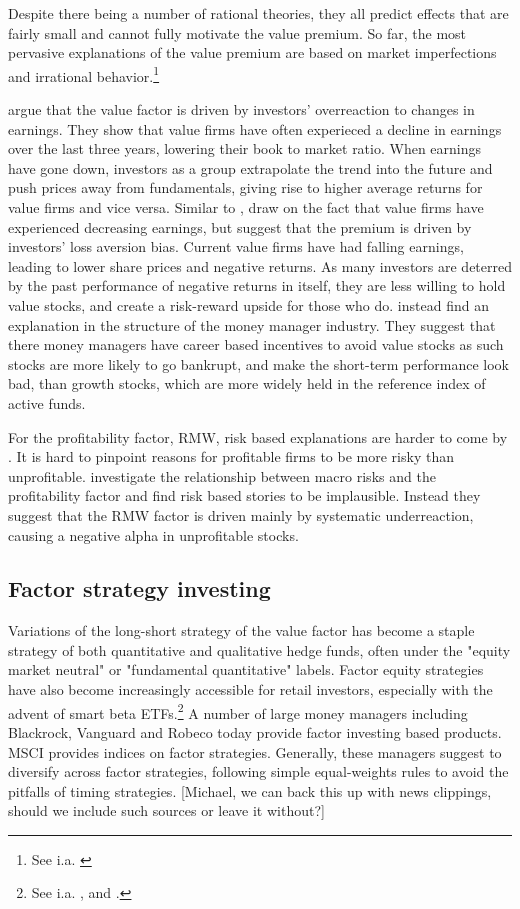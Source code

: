 Despite there being a number of rational theories, they all predict effects that are fairly small and cannot fully motivate the value premium. So far, the most pervasive explanations of the value premium are based on market imperfections and irrational behavior.\footnote{See i.a. \textcite{Ilmanen2011}}

\textcite{LakonishokShleiferVishny1994} argue that the value factor is driven by investors' overreaction to changes in earnings. They show that value firms have often experieced a decline in earnings over the last three years, lowering their book to market ratio. When earnings have gone down, investors as a group extrapolate the trend into the future and push prices away from fundamentals, giving rise to higher average returns for value firms and vice versa. Similar to \textcite{LakonishokShleiferVishny1994}, \textcite{BarberisHuang2001} draw on the fact that value firms have experienced decreasing earnings, but suggest that the premium is driven by investors' loss aversion bias. Current value firms have had falling earnings, leading to lower share prices and negative returns. As many investors are deterred by the past performance of negative returns in itself, they are less willing to hold value stocks, and create a risk-reward upside for those who do. \textcite{LakonishokShleiferVishny1992} instead find an explanation in the structure of the money manager industry. They suggest that there money managers have career based incentives to avoid value stocks as such stocks are more likely to go bankrupt, and make the short-term performance look bad, than growth stocks, which are more widely held in the reference index of active funds.

For the profitability factor, RMW, risk based explanations are harder to come by \autocite{NovyMarx2013}. It is hard to pinpoint reasons for profitable firms to be more risky than unprofitable. \textcite{Wang2013} investigate the relationship between macro risks and the profitability factor and find risk based stories to be implausible. Instead they suggest that the RMW factor is driven mainly by systematic underreaction, causing a negative alpha in unprofitable stocks.

\subsection{Factor strategy investing}
Variations of the long-short strategy of the value factor has become a staple strategy of both quantitative and qualitative hedge funds, often under the "equity market neutral" or "fundamental quantitative" labels. Factor equity strategies have also become increasingly accessible for retail investors, especially with the advent of smart beta ETFs.\footnote{See i.a. \textcite{Pedersen2015}, \textcite{AQREMN} and \textcite{McKEMN}.} A number of large money managers including Blackrock, Vanguard and Robeco today provide factor investing based products. MSCI provides indices on factor strategies. Generally, these managers suggest to diversify across factor strategies, following simple equal-weights rules to avoid the pitfalls of timing strategies. [Michael, we can back this up with news clippings, should we include such sources or leave it without?]

